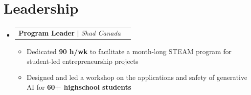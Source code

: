 \documentclass[letterpaper,11pt]{article}
\makeatletter
\newcommand{\resumeItem}[1]{
  \item\small{
    {#1 \vspace{-0.6pt}}
  }
}
\newcommand{\resumeSubheadingB}[3]{
  \vspace{0pt}\item
    \begin{tabular*}{0.97\textwidth}[t]{l@{\extracolsep{\fill}}r}
      \textbf{#1} $|$ \textit{#3} & #2 \\
    \end{tabular*}\vspace{-7pt}
}
\newcommand{\resumeSubHeadingListStart}{\begin{itemize}[leftmargin=0.15in, label={}]}
\newcommand{\resumeSubHeadingListEnd}{\end{itemize}}
\newcommand{\resumeItemListStart}{\begin{itemize}}
\newcommand{\resumeItemListEnd}{\end{itemize}\vspace{-7pt}}
\makeatother
\begin{document}
\section{Leadership}
  \resumeSubHeadingListStart
    \resumeSubheadingB{Program Leader}{}{Shad Canada}
      \resumeItemListStart
        \resumeItem{Dedicated \textbf{90 h/wk} to facilitate a month-long STEAM program for student-led entrepreneurship projects}
        \resumeItem{Designed and led a workshop on the applications and safety of generative AI for \textbf{60+ highschool students}}
      \resumeItemListEnd
  \resumeSubHeadingListEnd
\end{document}

